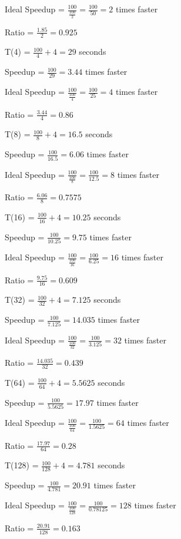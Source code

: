 \documentclass{article}
\begin{document}
    Ideal Speedup = $\frac{100}{\frac{100}{2}} = \frac{100}{50} = 2$ times faster

    Ratio = $\frac{1.85}{2} = 0.925$
    \vspace*{6pt}

    T(4) = $\frac{100}{4} + 4 = 29$ seconds

    Speedup = $\frac{100}{29} = 3.44$ times faster

    Ideal Speedup = $\frac{100}{\frac{100}{4}} = \frac{100}{25} = 4$ times faster

    Ratio = $\frac{3.44}{4} = 0.86$
    \vspace*{6pt}

    T(8) = $\frac{100}{8} + 4 = 16.5$ seconds

    Speedup = $\frac{100}{16.5} = 6.06$ times faster

    Ideal Speedup = $\frac{100}{\frac{100}{8}} = \frac{100}{12.5} = 8$ times faster

    Ratio = $\frac{6.06}{8} = 0.7575$
    \vspace*{6pt}

    T(16) = $\frac{100}{16} + 4 = 10.25$ seconds

    Speedup = $\frac{100}{10.25} = 9.75$ times faster

    Ideal Speedup = $\frac{100}{\frac{100}{16}} = \frac{100}{6.25} = 16$ times faster

    Ratio = $\frac{9.75}{16} = 0.609$
    \vspace*{6pt}

    T(32) = $\frac{100}{32} + 4 = 7.125$ seconds

    Speedup = $\frac{100}{7.125} = 14.035$ times faster

    Ideal Speedup = $\frac{100}{\frac{100}{32}} = \frac{100}{3.125} = 32$ times faster

    Ratio = $\frac{14.035}{32} = 0.439$
    \vspace*{6pt}

    T(64) = $\frac{100}{64} + 4 = 5.5625$ seconds

    Speedup = $\frac{100}{5.5625} = 17.97$ times faster

    Ideal Speedup = $\frac{100}{\frac{100}{64}} = \frac{100}{1.5625} = 64$ times faster

    Ratio = $\frac{17.97}{64} = 0.28$
    \vspace*{6pt}

    T(128) = $\frac{100}{128} + 4 = 4.781$ seconds

    Speedup = $\frac{100}{4.781} = 20.91$ times faster

    Ideal Speedup = $\frac{100}{\frac{100}{128}} = \frac{100}{0.78125} = 128$ times faster

    Ratio = $\frac{20.91}{128} = 0.163$
    \vspace*{6pt}
\end{document}
